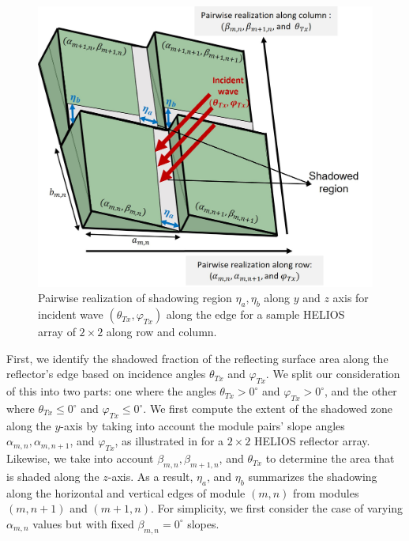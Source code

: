 \begin{figure}[tb]
	\centering
	\includegraphics[width=0.65\linewidth]{images/Section 3 Images/ShadowRegion1}
	\caption{Pairwise realization of shadowing region $\eta_{a},\eta_{b}$ along $y$ and $z$ axis for incident wave $(\theta_{Tx}, \varphi_{Tx})$ along the edge for a sample HELIOS array of $2\times 2$ along row and column.}
	\label{fig:Shadow region}
\end{figure}
First, we identify the shadowed fraction of the reflecting surface area along the reflector's edge based on incidence angles $\theta_{Tx}$ and $\varphi_{Tx}$. We split our consideration of this into two parts: one where the angles $\theta_{Tx} > \num{0}^\circ $ and $\varphi_{Tx} > \num{0}^\circ$, and the other where $\theta_{Tx} \leq \num{0}^\circ $ and $\varphi_{Tx} \leq \num{0}^\circ$. We first compute the extent of the shadowed zone along the $y$-axis by taking into account the module pairs' slope angles $\alpha_{m,n}, \alpha_{m,n+1}$, and $\varphi_{Tx}$, as illustrated in  for a $\num{2}\times \num{2}$ HELIOS reflector array. Likewise, we take into account $\beta_{m,n}, \beta_{m+1,n}$, and $\theta_{Tx}$ to determine the area that is shaded along the $z$-axis. As a result, $\eta_{a}$, and $\eta_{b}$ summarizes the shadowing along the horizontal and vertical edges of module $(m,n)$ from modules $(m,n+1)$ and $(m+1, n)$. For simplicity, we first consider the case of varying $\alpha_{m,n}$ values but with fixed $\beta_{m,n}=\num{0}^\circ$ slopes.

